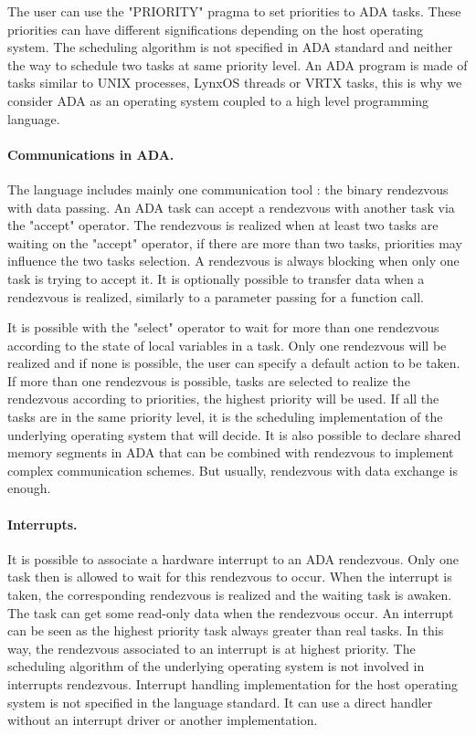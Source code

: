 \documentclass[10pt]{report}
\begin{document}
The user can use the "PRIORITY" pragma to set priorities to ADA tasks. These priorities can have different significations
depending on the host operating system. The scheduling algorithm is not specified in ADA standard and neither the way to schedule
two tasks at same priority level. An ADA program is made of tasks similar to UNIX processes, LynxOS threads or VRTX tasks, this
is why we consider ADA as an operating system coupled to a high level programming language.

\paragraph{Communications in ADA.} The language includes mainly one communication tool : the binary rendezvous with data passing.
An ADA task can accept a rendezvous with another task via the "accept" operator. The rendezvous is realized when at least two
tasks are waiting on the "accept" operator, if there are more than two tasks, priorities may influence the two tasks selection.
A rendezvous is always blocking when only one task is trying to accept it. It is optionally possible to transfer data when a
rendezvous is realized, similarly to a parameter passing for a function call.

It is possible with the "select" operator to wait for more than one rendezvous according to the state of local variables in a task.
Only one rendezvous will be realized and if none is possible, the user can specify a default action to be taken. If more than
one rendezvous is possible, tasks are selected to realize the rendezvous according to priorities, the highest priority will be
used. If all the tasks are in the same priority level, it is the scheduling implementation of the underlying operating system
that will decide. It is also possible to declare shared memory segments in ADA that can be combined with rendezvous to
implement complex communication schemes. But usually, rendezvous with data exchange is enough.

\paragraph{Interrupts.} It is possible to associate a hardware interrupt to an ADA rendezvous. Only one task then is allowed
to wait for this rendezvous to occur. When the interrupt is taken, the corresponding rendezvous is realized and the waiting
task is awaken. The task can get some read-only data when the rendezvous occur. An interrupt can be seen as the highest
priority task always greater than real tasks. In this way, the rendezvous associated to an interrupt is at highest priority.
The scheduling algorithm of the underlying operating system is not involved in interrupts rendezvous. Interrupt handling
implementation for the host operating system is not specified in the language standard. It can use a direct handler without
an interrupt driver or another implementation.
\end{document}
